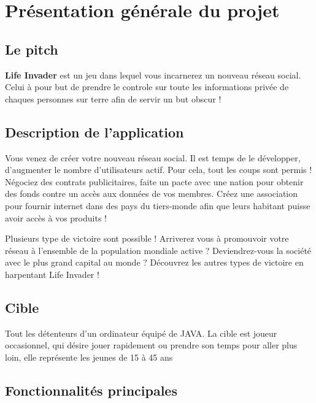 \chapter{Présentation générale du projet}
\label{chap:premierchapitre}

\section{Le pitch}
\textbf{Life Invader} est un jeu dans lequel vous incarnerez un nouveau réseau social. Celui à pour but de prendre le controle sur toute les informations privée de chaques personnes sur terre afin de servir un but obscur !

\section{Description de l'application}

Vous venez de créer votre nouveau réseau social. Il est temps de le développer, d'augmenter le nombre d'utilisateurs actif. Pour cela, tout les coups sont permis ! Négociez des contrats publicitaires, faite un pacte avec une nation pour obtenir des fonds contre un accès aux données de vos membres. Créez une association pour fournir internet dans des pays du tiers-monde afin que leurs habitant puisse avoir accès à vos produits !

Plusieurs type de victoire sont possible ! Arriverez vous à promouvoir votre réseau à l'ensemble de la population mondiale active ? Deviendrez-vous la société avec le plus grand capital au monde ? Découvrez les autres types de victoire en harpentant Life Invader !

\section{Cible}

Tout les détenteurs d'un ordinateur équipé de JAVA. La cible est joueur occasionnel, qui désire jouer rapidement ou prendre son temps pour aller plus loin, elle représente les jeunes de 15 à 45 ans

\section{Fonctionnalités principales}

